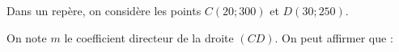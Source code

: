
Dans un repère, on considère les points $C(20;300)$ et $D(30;250)$.

On note $m$ le coefficient directeur de la droite $(CD)$. On peut affirmer que :

\smallskip
{}
